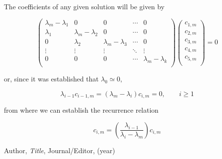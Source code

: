 \documentclass{article}
\theoremstyle{definition}
\theoremstyle{remark}
\begin{document}
The coefficients of any given solution will be given by

\begin{equation}
	\begin{pmatrix}
		\lambda_{m}-\lambda_{1} & 0                       & 0                       & \cdots & 0                       \\
		\lambda_{1}             & \lambda_{m}-\lambda_{2} & 0                       & \cdots & 0                       \\
		0                       & \lambda_{2}             & \lambda_{m}-\lambda_{3} & \cdots & 0                       \\
		\vdots                  & \vdots                  & \vdots                  & \ddots & \vdots                  \\
		0                       & 0                       & 0                       & \cdots & \lambda_{m}-\lambda_{k} \\
	\end{pmatrix}\begin{pmatrix}
		c_{1,m} \\
		c_{2,m} \\
		c_{3,m} \\
		c_{4,m} \\
		c_{5,m} \\
	\end{pmatrix}=0
\end{equation}

or, since it was established that $\lambda_{0}\simeq0$,

\begin{equation}
	\lambda_{i-1}c_{i-1,m}=(\lambda_{m}-\lambda_{i})c_{i,m}=0, \qquad i \geq1
\end{equation}

from where we can establish the recurrence relation

\begin{equation}
	c_{i,m}=\left(\frac{\lambda_{i-1}}{\lambda_{i}-\lambda_{m}}\right)c_{i,m}
\end{equation}
\begin{thebibliography}{99}

	 Author, \emph{Title}, Journal/Editor, (year)

\end{thebibliography}
\end{document}
